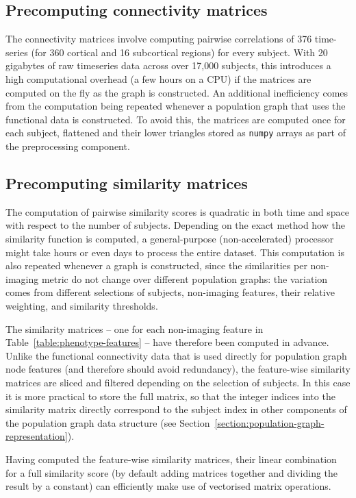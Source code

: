 \subsection{Precomputing connectivity matrices}
The connectivity matrices involve computing pairwise correlations of 376 time-series (for 360 cortical and 16 subcortical regions) for every subject. With 20 gigabytes of raw timeseries data across over 17,000 subjects, this introduces a high computational overhead (a few hours on a CPU) if the matrices are computed on the fly as the graph is constructed. An additional inefficiency comes from the computation being repeated whenever a population graph that uses the functional data is constructed. To avoid this, the matrices are computed once for each subject, flattened and their lower triangles stored as \texttt{numpy} arrays as part of the preprocessing component.


\subsection{Precomputing similarity matrices}
The computation of pairwise similarity scores is quadratic in both time and space with respect to the number of subjects. Depending on the exact method how the similarity function is computed, a general-purpose (non-accelerated) processor might take hours or even days to process the entire dataset. This computation is also repeated whenever a graph is constructed, since the similarities per non-imaging metric do not change over different population graphs: the variation comes from different selections of subjects, non-imaging features, their relative weighting, and similarity thresholds.

The similarity matrices – one for each non-imaging feature in Table~\ref{table:phenotype-features} – have therefore been computed in advance. Unlike the functional connectivity data that is used directly for population graph node features (and therefore should avoid redundancy), the feature-wise similarity matrices are sliced and filtered depending on the selection of subjects. In this case it is more practical to store the full matrix, so that the integer indices into the similarity matrix directly correspond to the subject index in other components of the population graph data structure (see Section~\ref{section:population-graph-representation}).

Having computed the feature-wise similarity matrices, their linear combination for a full similarity score (by default adding matrices together and dividing the result by a constant) can efficiently make use of vectorised matrix operations.

